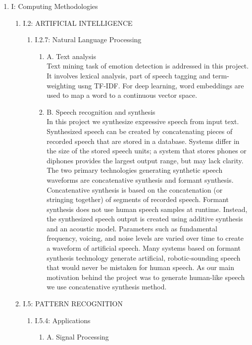 \documentclass[oneside,a4paper,12pt]{book}
\begin{document}
\begin{enumerate}
\begin{enumerate}
	\end{enumerate}	 
	\item[] I: Computing Methodologies
	\begin{enumerate}
		\item[] I.2: ARTIFICIAL INTELLIGENCE
		\begin{enumerate}
			\item[] I.2.7: Natural Language Processing
			\begin{enumerate}
				\item[] A. Text analysis \\
						Text mining task of emotion detection is addressed in this project. It involves lexical analysis, part of speech tagging and term-weighting usng TF-IDF. For deep learning, word embeddings are used to map a word to a continuous vector space.\\
				\item[] B. Speech recognition and synthesis\\
						In this project we synthesize expressive speech from input text. Synthesized speech can be created by concatenating pieces of recorded speech that are stored in a database.
						Systems differ in the size of the stored speech units; a system that stores phones or diphones provides the largest output range, but may lack clarity.
						The two primary technologies generating synthetic speech waveforms are concatenative synthesis and formant synthesis.
						Concatenative synthesis is based on the concatenation (or stringing together) of segments of recorded speech.
						Formant synthesis does not use human speech samples at runtime. Instead, the synthesized speech output is created using additive synthesis and an acoustic model.
						Parameters such as fundamental frequency, voicing, and noise levels are varied over time to create a waveform of artificial speech.
						Many systems based on formant synthesis technology generate artificial, robotic-sounding speech that would never be mistaken for human speech. As our main motivation behind the
						project was to generate human-like speech we use concatenative synthesis method.\\
			\end{enumerate}
		\end{enumerate}
		\item[] I.5: PATTERN RECOGNITION
		\begin{enumerate}
			\item[] I.5.4: Applications
			\begin{enumerate}
				\item[] A. Signal Processing

\end{enumerate}
\end{enumerate}
\end{enumerate}
\end{enumerate}
\end{document}
